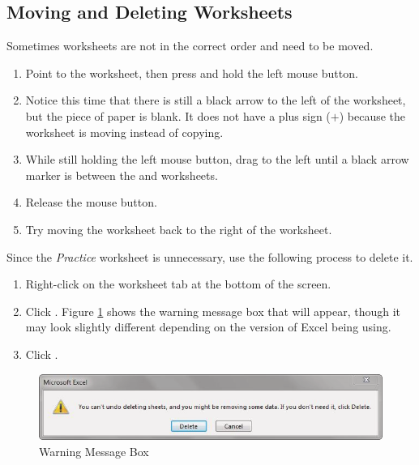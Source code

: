 \subsection{Moving and Deleting Worksheets}

Sometimes worksheets are not in the correct order and need to be moved.

\begin{enumbox}
	\begin{enumerate}
		\item Point to the  worksheet, then press and hold the left mouse button.
		\item Notice this time that there is still a black arrow to the left of the  worksheet, but the piece of paper is blank. It does not have a plus sign ($ + $) because the worksheet is moving instead of copying.
		\item While still holding the left mouse button, drag to the left until a black arrow marker is between the  and  worksheets.
		\item Release the mouse button.
		\item Try moving the  worksheet back to the right of the  worksheet.
	\end{enumerate}
\end{enumbox}

Since the \textit{Practice} worksheet is unnecessary, use the following process to delete it.

\begin{enumbox}
	\begin{enumerate}
		\item Right-click on the  worksheet tab at the bottom of the screen.
		\item Click . Figure \ref{06:fig03} shows the warning message box that will appear, though it may look slightly different depending on the version of Excel being using. 
		\item Click .
	\end{enumerate}
\end{enumbox}

\begin{figure}[H]
	\centering
	\includegraphics[width=\maxwidth{.95\linewidth}]{gfx/ch06_fig03}
	\caption{Warning Message Box}
	\label{06:fig03}
\end{figure}

